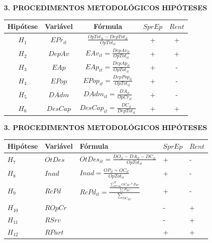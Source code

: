 \documentclass[
  ignorenonframetext,
  aspectratio=169,
  ignorenonframetext]{beamer}
\begin{document}
\begin{frame}{\textbf{3. PROCEDIMENTOS METODOLÓGICOS}}
\protect\hypertarget{procedimentos-metodoluxf3gicos-17}{}
\textbf{HIPÓTESES}

\begin{longtable}[]{@{}ccccc@{}}
\toprule
Hipótese & Variável & Fórmula & \(SprEp\) & \(Rent\) \\
\midrule
\endhead
\(H_{1}\) & \(EPr_{it}\) &
\(\frac{OpTot_{it} - DepTot_{it}}{OpTot_{it}}\) & + & + \\
\(H_{2}\) & \(DepAv\) & \(EAv_{it} = \frac{DepAv_{it}}{OpTot_{it}}\) & +
& + \\
\(H_{3}\) & \(EAp\) & \(EAp_{it} = \frac{DepAp_{it}}{OpTot_{it}}\) & + &
- \\
\(H_{4}\) & \(EPop\) & \(EPop_{it} = \frac{DepPop_{it}}{OpTot_{it}}\) &
+ & - \\
\(H_{5}\) & \(DAdm\) & \(DAdm_{it} = \frac{DA_{it}}{OpCr_{it}}\) & + &
- \\
\(H_{6}\) & \(DesCap\) & \(DesCap_{it} = \frac{DC_{it}}{DepTot_{it}}\) &
+ & + \\
\bottomrule
\end{longtable}
\end{frame}

\begin{frame}{\textbf{3. PROCEDIMENTOS METODOLÓGICOS}}
\protect\hypertarget{procedimentos-metodoluxf3gicos-18}{}
\textbf{HIPÓTESES}

\begin{longtable}[]{@{}
  >{\centering\arraybackslash}p{}
  >{\centering\arraybackslash}p{}
  >{\centering\arraybackslash}p{}
  >{\centering\arraybackslash}p{}
  >{\centering\arraybackslash}p{}@{}}
\toprule
Hipótese & Variável & Fórmula & \(SprEp\) & \(Rent\) \\
\midrule
\endhead
\(H_{7}\) & \(OtDes\) &
\(OtDes_{it} = \frac{ DO_{it} - DA_{it} - DC_{it} }{ OpTot_{it} }\) & +
& - \\
\(H_{8}\) & \(Inad\) & \(Inad = \frac{ OP_{it} + OC_{it} }{OpTot_{it}}\)
& + & - \\
\(H_{9}\) & \(RcPd\) &
\(RcPd_{it} = \frac{\frac{\sum_{RCAa}^HOC_{RC}*P_{RC}}{\sum_{}P_{RC}}}{\sum_{OC_{RC}}}\)
& + & - \\
\(H_{10}\) & \(ROpCr\) & & - & + \\
\(H_{11}\) & \(RSrv\) & & - & + \\
\(H_{12}\) & \(RPart\) & & + & + \\
\bottomrule
\end{longtable}
\end{frame}
\end{document}
